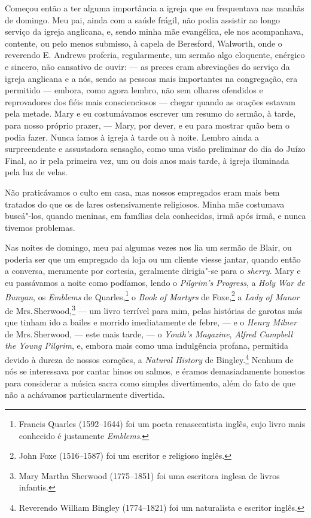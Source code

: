 Começou então a ter alguma importância a igreja que eu frequentava
nas manhãs de domingo. Meu pai, ainda com a saúde frágil, não podia
assistir ao longo serviço da igreja anglicana, e, sendo minha mãe
evangélica, ele nos acompanhava, contente, ou pelo menos submisso, à
capela de Beresford, Walworth, onde o reverendo E. Andrews proferia,
regularmente, um sermão algo eloquente, enérgico e sincero, não
cansativo de ouvir: --- as preces eram abreviações do serviço da igreja
anglicana e a nós, sendo as pessoas mais importantes na congregação, era
permitido --- embora, como agora lembro, não sem olhares ofendidos e
reprovadores dos fiéis mais conscienciosos --- chegar quando as orações
estavam pela metade. Mary e eu costumávamos escrever um resumo do
sermão, à tarde, para nosso próprio prazer, --- Mary, por dever, e eu
para mostrar quão bem o podia fazer. Nunca íamos à igreja à tarde ou à
noite. Lembro ainda a surpreendente e assustadora sensação, como uma
visão preliminar do dia do Juízo Final, ao ir pela primeira vez, um ou
dois anos mais tarde, à igreja iluminada pela luz de velas.

Não praticávamos o culto em casa, mas nossos empregados eram mais
bem tratados do que os de lares ostensivamente religiosos. Minha mãe
costumava buscá"-los, quando meninas, em famílias dela conhecidas, irmã
após irmã, e nunca tivemos problemas.

Nas noites de domingo, meu pai algumas vezes nos lia um sermão de Blair,
ou poderia ser que um empregado da loja ou um cliente viesse jantar,
quando então a conversa, meramente por cortesia, geralmente dirigia"-se
para o \textit{sherry}. Mary e eu passávamos a noite como podíamos, lendo
o \textit{Pilgrim's Progress}, a \textit{Holy War de Bunyan}, os
\textit{Emblems} de Quarles,\footnote{Francis Quarles (1592--1644) foi um poeta
  renascentista inglês, cujo livro mais conhecido é justamente
  \textit{Emblems}.} o \textit{Book of Martyrs} de
Foxe,\footnote{John Foxe (1516--1587) foi um escritor e religioso inglês.} a \textit{Lady of Manor} de Mrs.\,Sherwood,\footnote{Mary Martha
  Sherwood (1775--1851) foi uma escritora inglesa de livros infantis.} --- um livro terrível para mim, pelas histórias de garotas más
que tinham ido a bailes e morrido imediatamente de febre, --- e o
\textit{Henry Milner} de Mrs.\,Sherwood, --- este mais tarde, --- o
\textit{Youth's Magazine}, \textit{Alfred Campbell the Young
Pilgrim}, e, embora mais como uma indulgência profana, permitida devido
à dureza de nossos corações, a \textit{Natural History} de
Bingley.\footnote{Reverendo William Bingley (1774--1821) foi um naturalista e
  escritor inglês.} Nenhum de nós se interessava por
cantar hinos ou salmos, e éramos demasiadamente honestos para considerar
a música sacra como simples divertimento, além do fato de que não a
achávamos particularmente divertida.

